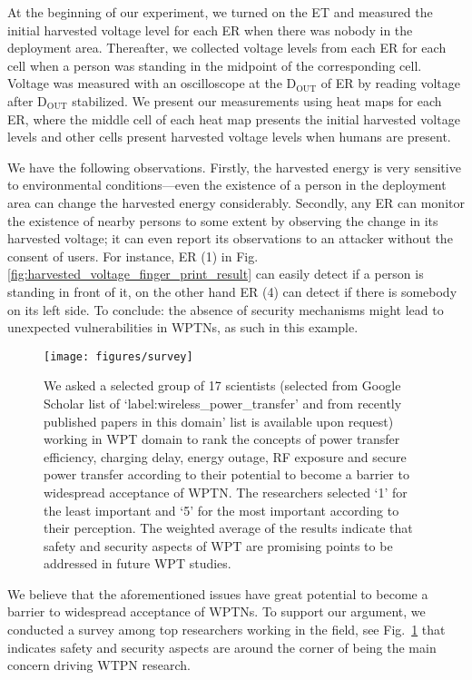\documentclass[journal,10pt,draftclsnofoot,onecolumn]{IEEEtran}
\begin{document}
At the beginning of our experiment, we turned on the ET and measured the initial harvested voltage level for each ER when there was nobody in the deployment area. Thereafter, we collected voltage levels from each ER for each cell when a person was standing in the midpoint of the corresponding cell. Voltage was measured with an oscilloscope at the D$_{\text{OUT}}$ of ER by reading voltage after D$_{\text{OUT}}$ stabilized. We present our measurements using heat maps for each ER, where the middle cell of each heat map presents the initial harvested voltage levels and other cells present harvested voltage levels when humans are present.

We have the following observations. Firstly, the harvested energy is very sensitive to environmental conditions---even the existence of a person in the deployment area can change the harvested energy considerably. Secondly, any ER can monitor the existence of nearby persons to some extent by observing the change in its harvested voltage; it can even report its observations to an attacker without the consent of users. For instance, ER (1) in Fig. \ref{fig:harvested_voltage_finger_print_result} can easily detect if a person is standing in front of it, on the other hand ER (4) can detect if there is somebody on its left side. To conclude: the absence of security mechanisms might lead to unexpected vulnerabilities in WPTNs, as such in this example.   

\begin{figure}
	\centering
	\texttt{[image: figures/survey]}
	\caption{\label{fig:survey} We asked a selected group of 17 scientists (selected from Google Scholar list of `label:wireless\_power\_transfer' and from recently published papers in this domain' list is available upon request) working in WPT domain to rank the concepts of power transfer efficiency, charging delay, energy outage, RF exposure and secure power transfer according to their potential to become a barrier to widespread acceptance of WPTN. The researchers selected `1' for the least important and `5' for the most important according to their perception. The weighted average of the results indicate that safety and security aspects of WPT are promising points to be addressed in future WPT studies.}
\end{figure}

We believe that the aforementioned issues have great potential to become a barrier to widespread acceptance of WPTNs. To support our argument, we conducted a survey among top researchers working in the field, see Fig.~\ref{fig:survey} that indicates safety and security aspects are around the corner of being the main concern driving WTPN research. 
\end{document}
